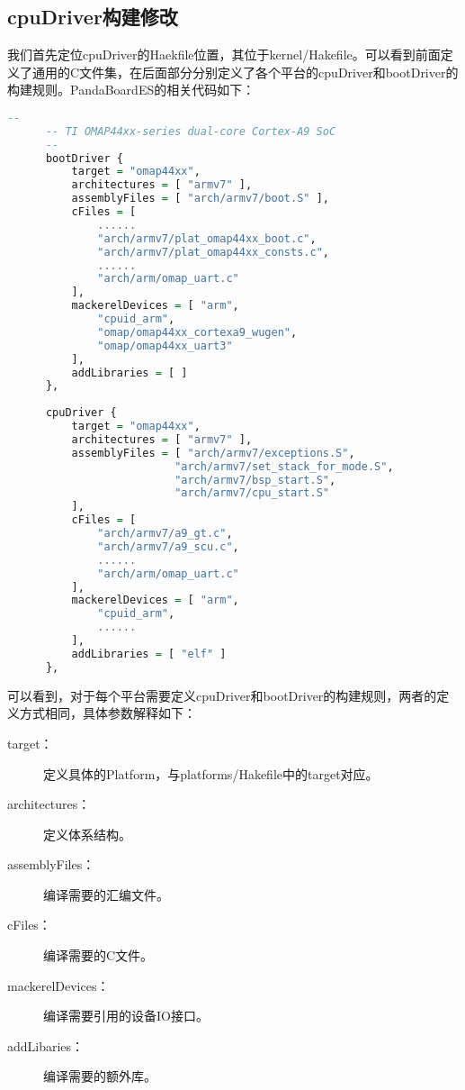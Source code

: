 \documentclass[a4paper, 12pt]{report}
\begin{document}
    \subsection{cpuDriver构建修改}
    我们首先定位cpuDriver的Haekfile位置，其位于kernel/Hakefile。可以看到前面定义了通用的C文件集，在后面部分分别定义了各个平台的cpuDriver和bootDriver的构建规则。PandaBoardES的相关代码如下：
    
    \begin{lstlisting}[language = Haskell]
      --
      -- TI OMAP44xx-series dual-core Cortex-A9 SoC
      --
      bootDriver {
          target = "omap44xx",
          architectures = [ "armv7" ],
          assemblyFiles = [ "arch/armv7/boot.S" ],
          cFiles = [
              ......
              "arch/armv7/plat_omap44xx_boot.c",
              "arch/armv7/plat_omap44xx_consts.c",
              ......
              "arch/arm/omap_uart.c"
          ],
          mackerelDevices = [ "arm",
              "cpuid_arm",
              "omap/omap44xx_cortexa9_wugen",
              "omap/omap44xx_uart3"
          ],
          addLibraries = [ ]
      },
      
      cpuDriver {
          target = "omap44xx",
          architectures = [ "armv7" ],
          assemblyFiles = [ "arch/armv7/exceptions.S",
                          "arch/armv7/set_stack_for_mode.S",
                          "arch/armv7/bsp_start.S",
                          "arch/armv7/cpu_start.S"
          ],
          cFiles = [
              "arch/armv7/a9_gt.c",
              "arch/armv7/a9_scu.c",
              ......
              "arch/arm/omap_uart.c"
          ],
          mackerelDevices = [ "arm",
              "cpuid_arm",
              ......
          ],
          addLibraries = [ "elf" ]
      },
    \end{lstlisting}
    
    可以看到，对于每个平台需要定义cpuDriver和bootDriver的构建规则，两者的定义方式相同，具体参数解释如下：
    
    \begin{description}
        \item[target：] 定义具体的Platform，与platforms/Hakefile中的target对应。
        \item[architectures：] 定义体系结构。
        \item[assemblyFiles：] 编译需要的汇编文件。
        \item[cFiles：] 编译需要的C文件。
        \item[mackerelDevices：] 编译需要引用的设备IO接口。
        \item[addLibaries：] 编译需要的额外库。
    \end{description}
    
\end{document}
